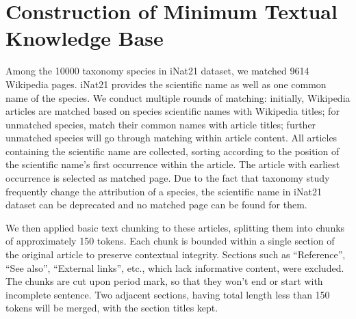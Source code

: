\section{Construction of Minimum Textual Knowledge Base}
\label{sec:text_kb}

Among the 10000 taxonomy species in iNat21 dataset, we matched 9614 Wikipedia pages. iNat21 provides the scientific name as well as one common name of the species. We conduct multiple rounds of matching: initially, Wikipedia articles are matched based on species scientific names with Wikipedia titles; for unmatched species, match their common names with article titles; further unmatched species will go through matching within article content. All articles containing the scientific name are collected, sorting according to the position of the scientific name's first occurrence within the article. The article with earliest occurrence is selected as matched page. Due to the fact that taxonomy study frequently change the attribution of a species, the scientific name in iNat21 dataset can be deprecated and no matched page can be found for them.

We then applied basic text chunking to these articles, splitting them into chunks of approximately 150 tokens. Each chunk is bounded within a single section of the original article to preserve contextual integrity. Sections such as ``Reference'', ``See also'', ``External links'', etc., which lack informative content, were excluded. The chunks are cut upon period mark, so that they won't end or start with incomplete sentence. Two adjacent sections, having total length less than 150 tokens will be merged, with the section titles kept.

